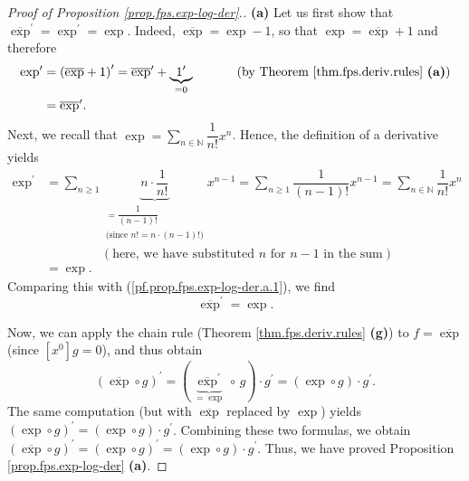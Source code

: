 \begin{proof}
[Proof of Proposition \ref{prop.fps.exp-log-der}.]\textbf{(a)} Let us first
show that $\overline{\exp}^{\prime}=\exp^{\prime}=\exp$. Indeed,
$\overline{\exp}=\exp-1$, so that $\exp=\overline{\exp}+1$ and therefore%
\begin{align}
\exp^{\prime}  &  =\left(  \overline{\exp}+1\right)  ^{\prime}=\overline{\exp
}^{\prime}+\underbrace{1^{\prime}}_{=0}\ \ \ \ \ \ \ \ \ \ \left(  \text{by
Theorem \ref{thm.fps.deriv.rules} \textbf{(a)}}\right) \nonumber\\
&  =\overline{\exp}^{\prime}. \label{pf.prop.fps.exp-log-der.a.1}%
\end{align}
Next, we recall that $\exp=\sum_{n\in\mathbb{N}}\dfrac{1}{n!}x^{n}$. Hence,
the definition of a derivative yields%
\begin{align}
\exp^{\prime}  &  =\sum_{n\geq1}\underbrace{n\cdot\dfrac{1}{n!}}%
_{\substack{=\dfrac{1}{\left(  n-1\right)  !}\\\text{(since }n!=n\cdot\left(
n-1\right)  !\text{)}}}x^{n-1}=\sum_{n\geq1}\dfrac{1}{\left(  n-1\right)
!}x^{n-1}=\sum_{n\in\mathbb{N}}\dfrac{1}{n!}x^{n}\nonumber\\
&  \ \ \ \ \ \ \ \ \ \ \ \ \ \ \ \ \ \ \ \ \left(  \text{here, we have
substituted }n\text{ for }n-1\text{ in the sum}\right) \nonumber\\
&  =\exp. \label{pf.prop.fps.exp-log-der.a.2}%
\end{align}
Comparing this with (\ref{pf.prop.fps.exp-log-der.a.1}), we find
\begin{equation}
\overline{\exp}^{\prime}=\exp. \label{pf.prop.fps.exp-log-der.a.3}%
\end{equation}


Now, we can apply the chain rule (Theorem \ref{thm.fps.deriv.rules}
\textbf{(g)}) to $f=\overline{\exp}$ (since $\left[  x^{0}\right]  g=0$), and
thus obtain%
\[
\left(  \overline{\exp}\circ g\right)  ^{\prime}=\left(  \underbrace{\overline
{\exp}^{\prime}}_{=\exp}\circ\,g\right)  \cdot g^{\prime}=\left(  \exp\circ
g\right)  \cdot g^{\prime}.
\]
The same computation (but with $\overline{\exp}$ replaced by $\exp$) yields
$\left(  \exp\circ g\right)  ^{\prime}=\left(  \exp\circ g\right)  \cdot
g^{\prime}$. Combining these two formulas, we obtain $\left(  \overline{\exp
}\circ g\right)  ^{\prime}=\left(  \exp\circ g\right)  ^{\prime}=\left(
\exp\circ g\right)  \cdot g^{\prime}$. Thus, we have proved Proposition
\ref{prop.fps.exp-log-der} \textbf{(a)}.


\end{proof}
